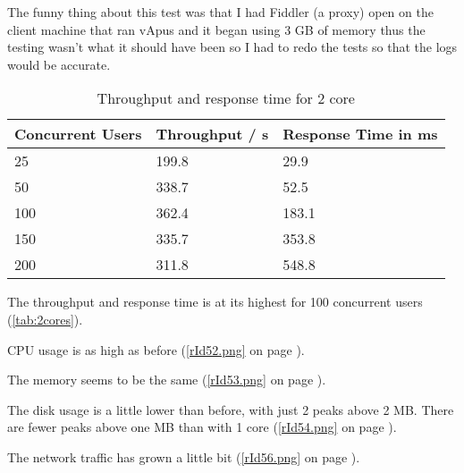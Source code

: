 The funny thing about this test was that I had Fiddler (a proxy) open on the client machine that ran vApus and it began using 3 GB of memory thus the testing wasn't what it should have been so I had to redo the tests so that the logs would be accurate.

\begin{table}[ht!]
\begin{center}
\caption{Throughput and response time for 2 core} \label{tab:2cores}
\begin{tabular}{|p{2.2cm}|p{2.2cm}|p{2.2cm}|}\hline\rowcolor{myLightGreen}\arrayrulecolor{myLightGreen}
 {\bf\color{white} Concurrent Users} & {\bf\color{white} Throughput / s} & {\bf\color{white} Response Time in ms} \\ \hline 
 25 & 199.8 & 29.9 \\ \hline 
 50 & 338.7 & 52.5 \\ \hline \rowcolor{rowhighlight}
 100 & 362.4 & 183.1 \\ \hline 
 150 & 335.7 & 353.8 \\ \hline 
 200 & 311.8 & 548.8 \\ \hline 
\end{tabular}
\end{center}
\end{table}
The throughput and response time is at its highest for 100 concurrent users (\autoref{tab:2cores}).

CPU usage is as high as before (\autoref{rId52.png} on page \pageref{rId52.png}).

The memory seems to be the same  (\autoref{rId53.png} on page \pageref{rId53.png}).

The disk usage is a little lower than before, with just 2 peaks above 2 MB. There are fewer peaks above one MB than with 1 core (\autoref{rId54.png} on page \pageref{rId54.png}).

The network traffic has grown a little bit  (\autoref{rId56.png} on page \pageref{rId56.png}).
\clearpage{}

